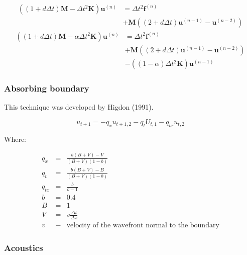 \documentclass[a4paper,10pt]{book}
\begin{document}
    \begin{equation}
    \begin{split}
    \left(
        \left(1+d\Delta t\right)\mathbf{M}-\Delta t^2\mathbf{K}
    \right)\mathbf{u}^{(n)}&=
    \Delta t^2\mathbf{f}^{(n)}\\&+\mathbf{M}
    \left(
        \left(2+d\Delta t\right)\mathbf{u}^{(n-1)}-\mathbf{u}^{(n-2)}
    \right)
    \end{split}
    \end{equation}
    \begin{equation}
    \begin{split}
    \left(
        \left(1+d\Delta t\right)\mathbf{M}-\alpha\Delta t^2\mathbf{K}
    \right)\mathbf{u}^{(n)}&=
    \Delta t^2\mathbf{f}^{(n)}\\&+\mathbf{M}
    \left(
        \left(2+d\Delta t\right)\mathbf{u}^{(n-1)}-\mathbf{u}^{(n-2)}
    \right)\\
    &-\left(
        \left(1-\alpha\right)\Delta t^2\mathbf{K}
    \right)\mathbf{u}^{(n-1)}
    \end{split}
    \end{equation}

\subsubsection{Absorbing boundary}

    This technique was developed by Higdon (1991).

    \begin{equation}
    u_{t+1}=-q_xu_{t+1,2}-q_tU_{t,1}-q_{tx}u_{t,2}
    \end{equation}

    Where:

    \begin{eqnarray*}
    q_x&=&\frac{b\left(B+V\right)-V}{\left(B+V\right)\left(1-b\right)}\\
    q_t&=&\frac{b\left(B+V\right)-B}{\left(B+V\right)\left(1-b\right)}\\
    q_{tx}&=&\frac{b}{b-1}\\
    b&=&0.4\\
    B&=&1\\
    V&=&v\frac{\Delta t}{\Delta x}\\
    v&-&\text{velocity of the wavefront normal to the boundary}
    \end{eqnarray*}

\subsubsection{Acoustics}
\end{document}
